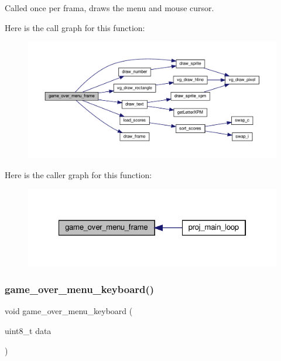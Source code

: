 Called once per frama, draws the menu and mouse cursor. 

Here is the call graph for this function\+:\nopagebreak
\begin{figure}[H]
\begin{center}
\leavevmode
\includegraphics[width=350pt]{group__Game-Over-Menu_ga8105461ec4f2f3dc83bf6b821b353144_cgraph}
\end{center}
\end{figure}
Here is the caller graph for this function\+:\nopagebreak
\begin{figure}[H]
\begin{center}
\leavevmode
\includegraphics[width=322pt]{group__Game-Over-Menu_ga8105461ec4f2f3dc83bf6b821b353144_icgraph}
\end{center}
\end{figure}
\mbox{\label{group__Game-Over-Menu_ga8a878da05a37cf4c3e82b28282dc5c47}} 
\subsubsection{\texorpdfstring{game\+\_\+over\+\_\+menu\+\_\+keyboard()}{game\_over\_menu\_keyboard()}}
{\footnotesize\ttfamily void game\+\_\+over\+\_\+menu\+\_\+keyboard (\begin{DoxyParamCaption}\item[{uint8\+\_\+t}]{data }\end{DoxyParamCaption})}



